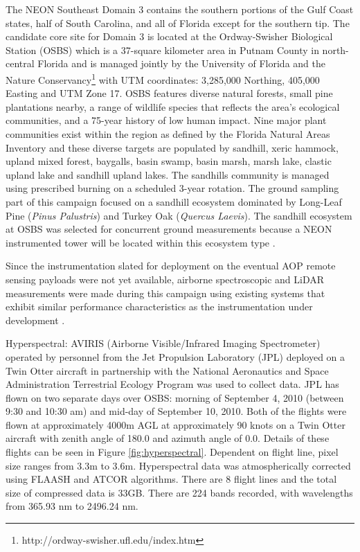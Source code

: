 \documentclass[remotesensing,article,accept,moreauthors,pdftex,12pt,a4paper]{mdpi}
\begin{document}
The NEON Southeast Domain 3 contains the southern portions of the Gulf Coast states, half of South Carolina, and all of Florida except for the southern tip. The candidate core site for Domain 3 is located at the Ordway-Swisher Biological Station (OSBS) which is a 37-square kilometer area in Putnam County in north-central Florida and is managed jointly by the University of Florida and the Nature Conservancy\footnote{http://ordway-swisher.ufl.edu/index.htm} with UTM coordinates: 3,285,000 Northing, 405,000 Easting and UTM Zone 17. OSBS features diverse natural forests, small pine plantations nearby, a range of wildlife species that reflects the area's ecological communities, and a 75-year history of low human impact.  Nine major plant communities exist within the region as defined by the Florida Natural Areas Inventory and these diverse targets are populated by sandhill, xeric hammock, upland mixed forest, baygalls, basin swamp, basin marsh, marsh lake, clastic upland lake and sandhill upland lakes. The sandhills community is managed using prescribed burning on a scheduled 3-year rotation. The ground sampling part of this campaign focused on a sandhill ecosystem dominated by Long-Leaf Pine (\textit{Pinus Palustris}) and Turkey Oak (\textit{Quercus Laevis}). The sandhill ecosystem at OSBS was selected for concurrent ground measurements because a NEON instrumented tower will be located within this ecosystem type \cite{neon2010aopdatarelease, kampea2010aop}.

Since the instrumentation slated for deployment on the eventual AOP remote sensing payloads were not yet available, airborne spectroscopic and LiDAR measurements were made during this campaign using existing systems that exhibit similar performance characteristics as the instrumentation under development \cite{kampea2010aop}.

Hyperspectral: AVIRIS (Airborne Visible/Infrared Imaging Spectrometer) operated by personnel from the Jet Propulsion Laboratory (JPL) deployed on a Twin Otter aircraft in partnership with the National Aeronautics and Space Administration Terrestrial Ecology Program was used to collect data. JPL has flown on two separate days over OSBS: morning of September 4, 2010 (between 9:30 and 10:30 am) and mid-day of September 10, 2010. Both of the flights were flown at approximately 4000m AGL at approximately 90 knots on a Twin Otter aircraft with zenith angle of 180.0 and azimuth angle of 0.0. Details of these flights can be seen in Figure \ref{fig:hyperspectral}. Dependent on flight line, pixel size ranges from 3.3m to 3.6m. Hyperspectral data was atmospherically corrected using FLAASH \cite{adler1998flaash} and ATCOR \cite{richter2005atmospheric} algorithms. There are 8 flight lines and the total size of compressed data is 33GB. There are 224 bands recorded, with wavelengths from 365.93 nm to 2496.24 nm. 
\end{document}
